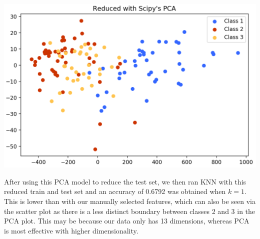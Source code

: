 \documentclass[11pt]{article}
\begin{document}
\begin{center}
\includegraphics[scale=0.3]{pca_scatter_graph}
\end{center}

After using this PCA model to reduce the test set, we then ran KNN with this reduced train and test set and an accuracy of 0.6792 was obtained when $k = 1$. This is lower than with our manually selected features, which can also be seen via the scatter plot as there is a less distinct boundary between classes 2 and 3 in the PCA plot. This may be because our data only has 13 dimensions, whereas PCA is most effective with higher dimensionality.
\end{document}
